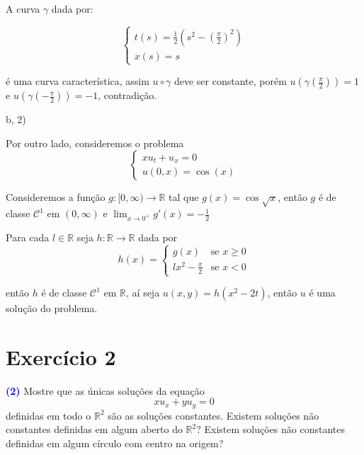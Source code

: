 \documentclass[11pt,a4paper]{article}
\newcommand{\exercicio}[1]{\section*{Exercício #1} \textcolor{blue}{\bf(#1)}}
\begin{document}
{\medskip
\noindent
A curva $\gamma$ dada por:

\[
\begin{cases}
    t(s)=\frac{1}{2}(s^2-(\frac{\pi}{2})^2) \\
    x(s)=s
\end{cases}
\]

\noindent
é uma curva característica, assim $u\circ\gamma$ deve ser constante, porém $u(\gamma(\frac{\pi}{2}))=1$ e $u(\gamma(-\frac{\pi}{2}))=-1$, contradição.

\bigskip
\noindent
b, 2)

\medskip
\noindent
Por outro lado, consideremos o problema
\[
\left\{\begin{array}{c}
xu_t + u_x = 0 \\
u(0,x) = \cos(x)
\end{array}
\right.
\]

\noindent
Consideremos a função $g:[0,\infty)\rightarrow\mathbb{R}$ tal que $g(x)=\cos\sqrt{x}$, então $g$ é de classe $\mathcal{C}^1$ em $(0,\infty)$ e $\lim_{x\rightarrow 0^+}g'(x)=-\frac{1}{2}$

\medskip
\noindent
Para cada $l\in\mathbb{R}$ seja $h:\mathbb{R}\rightarrow\mathbb{R}$ dada por
\[
h(x)=\begin{cases}
    g(x) & \text{se }x\geq 0\\
    lx^2-\frac{x}{2}
    & \text{se }x<0
\end{cases}
\]

então $h$ é de classe $\mathcal{C}^1$ em $\mathbb{R}$, aí seja $u(x,y)=h(x^2-2t)$, então $u$ é uma solução do problema.}

\exercicio{2} Mostre que as únicas soluções da equação
\[xu_x + yu_y = 0 \]
definidas em todo o $\mathbb{R}^2$ são as soluções constantes. Existem soluções não constantes definidas em algum aberto do $\mathbb{R}^2?$ Existem soluções não constantes definidas em algum círculo com centro na origem?
\end{document}
